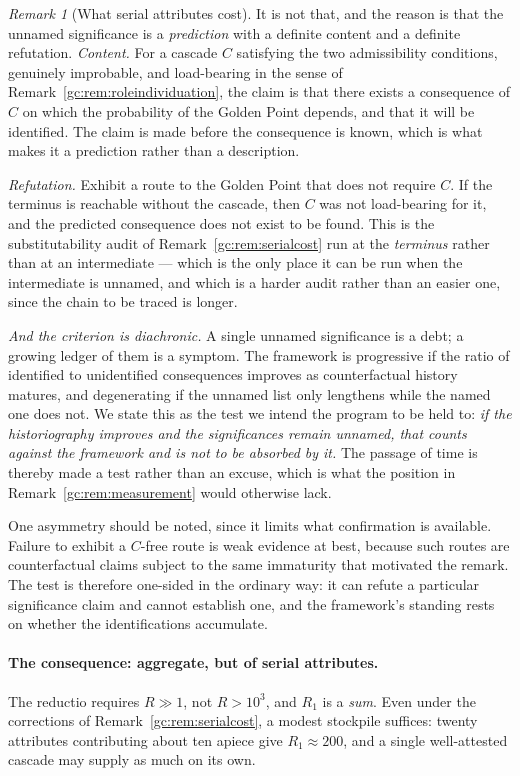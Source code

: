 \documentclass[11pt]{article}
\numberwithin{equation}{section}
\theoremstyle{plain}
\theoremstyle{definition}
\theoremstyle{remark}
\newtheorem{remark}[theorem]{Remark}
\begin{document}
\begin{remark}[What serial attributes cost]
It is not that, and the reason is that the unnamed significance is a
\emph{prediction} with a definite content and a definite refutation. \emph{Content.} For a cascade $C$ satisfying the two admissibility
conditions, genuinely improbable, and load-bearing in the sense of
Remark~\ref{gc:rem:roleindividuation}, the claim is that there exists
a consequence of $C$ on which the probability of the Golden Point
depends, and that it will be identified. The claim is made before the
consequence is known, which is what makes it a prediction rather than a
description.

\emph{Refutation.} Exhibit a route to the Golden Point that does not
require $C$. If the terminus is reachable without the cascade, then
$C$ was not load-bearing for it, and the predicted consequence does not
exist to be found. This is the substitutability audit of
Remark~\ref{gc:rem:serialcost} run at the \emph{terminus} rather than at
an intermediate --- which is the only place it can be run when the
intermediate is unnamed, and which is a harder audit rather than an
easier one, since the chain to be traced is longer.

\emph{And the criterion is diachronic.} A single unnamed significance
is a debt; a growing ledger of them is a symptom. The framework is
progressive if the ratio of identified to unidentified consequences
improves as counterfactual history matures, and degenerating if the
unnamed list only lengthens while the named one does not. We state this
as the test we intend the program to be held to: \emph{if the
historiography improves and the significances remain unnamed, that
counts against the framework and is not to be absorbed by it.} The
passage of time is thereby made a test rather than an excuse, which is
what the position in Remark~\ref{gc:rem:measurement} would otherwise
lack.

One asymmetry should be noted, since it limits what confirmation is
available. Failure to exhibit a $C$-free route is weak evidence at best,
because such routes are counterfactual claims subject to the same
immaturity that motivated the remark. The test is therefore one-sided in
the ordinary way: it can refute a particular significance claim and
cannot establish one, and the framework's standing rests on
whether the identifications accumulate.

\paragraph{The consequence: aggregate, but of serial attributes.} The
reductio requires $R\gg1$, not $R>10^{3}$, and $R_1$ is a \emph{sum}.
Even under the corrections of Remark~\ref{gc:rem:serialcost}, a modest
stockpile suffices: twenty attributes contributing about ten apiece
give $R_1\approx200$, and a single well-attested cascade may supply as
much on its own.


\end{remark}
\end{document}
